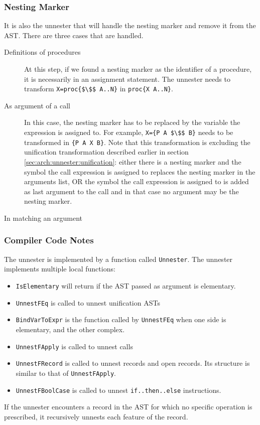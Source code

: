 \documentclass[a4paper]{memoir}
\begin{document}
\subsubsection{Nesting Marker}\label{sec:arch:unnester:nestingmarker}
It is also the unnester that will handle the nesting marker and remove it from the AST. There are three cases that are handled.
\begin{description}
  \item[Definitions of procedures] At this step, if we found a nesting marker as the identifier of a procedure, it is necessarily in an assignment statement. The unnester needs to transform \lstinline[mathescape]!X=proc{$\$$ A..N}! in \lstinline!proc{X A..N}!.
  \item[As argument of a call] In this case, the nesting marker has to be replaced by the variable the expression is assigned to. For example, \lstinline[mathescape]!X={P A $\$$ B}! needs to be transformed in  \lstinline!{P A X B}!. Note that this transformation is excluding the unification transformation described earlier in section \ref{sec:arch:unnester:unification}: either there is a nesting marker and the symbol the call expression is assigned to replaces the nesting marker in the arguments list, OR the symbol the call expression is assigned to is added as last argument to the call and in that case no argument may be the nesting marker.
  \item[In matching an argument] %
\end{description}

\subsubsection{Compiler Code Notes}
The unnester is implemented by a function called \lstinline!Unnester!. The unnester implements multiple local functions:
\begin{itemize}
  \item  \lstinline!IsElementary! will return if the AST passed as argument is elementary.
  \item  \lstinline!UnnestFEq! is called to unnest unification ASTs
  \item  \lstinline!BindVarToExpr! is the function called by \lstinline!UnnestFEq! when one side is elementary, and the other complex.
  \item  \lstinline!UnnestFApply! is called to unnest calls
  \item  \lstinline!UnnestFRecord! is called to unnest records and open records. Its structure is similar to that of \lstinline!UnnestFApply!.
  \item  \lstinline!UnnestFBoolCase! is called to unnest \lstinline!if..then..else! instructions.
\end{itemize}
If the unnester encounters a record in the AST for which no specific operation is prescribed, it recursively unnests each feature of the record.
\end{document}
